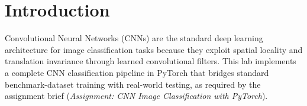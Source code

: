 \documentclass[11pt,a4paper]{article}
\begin{document}
\begin{titlepage}
    \begin{center}
    \setlength{\fboxsep}{16pt}
    \end{center}

    \vfill

\end{titlepage}

\tableofcontents
\newpage

\section{Introduction}

Convolutional Neural Networks (CNNs) are the standard deep learning architecture for image classification tasks because they exploit spatial locality and translation invariance through learned convolutional filters. This lab implements a complete CNN classification pipeline in PyTorch that bridges standard benchmark-dataset training with real-world testing, as required by the assignment brief (\textit{Assignment: CNN Image Classification with PyTorch}).
\end{document}
